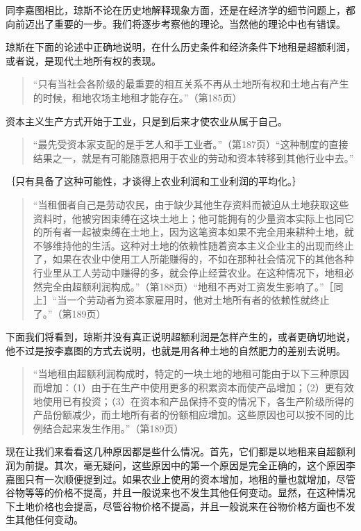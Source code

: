 同李嘉图相比，琼斯不论在历史地解释现象方面，还是在经济学的细节问题上，都向前迈出了重要的一步。我们将逐步考察他的理论。当然他的理论中也有错误。

琼斯在下面的论述中正确地说明，在什么历史条件和经济条件下地租是超额利润，或者说，是现代土地所有权的表现。

\begin{quote}{“只有当社会各阶级的最重要的相互关系不再从土地所有权和土地占有产生的时候，租地农场主地租才能存在。”（第185页）}\end{quote}

资本主义生产方式开始于工业，只是到后来才使农业从属于自己。

\begin{quote}{“最先受资本家支配的是手艺人和手工业者。”（第187页）“这种制度的直接结果之一，就是有可能随意把用于农业的劳动和资本转移到其他行业中去。”}\end{quote}

｛只有具备了这种可能性，才谈得上农业利润和工业利润的平均化。｝

\begin{quote}{“当租佃者自己是劳动农民，由于缺少其他生存资料而被迫从土地获取这些资料时，他被穷困束缚在这块土地上；他可能拥有的少量资本实际上也同它的所有者一起被束缚在土地上，因为这笔资本如果不完全用来耕种土地，就不够维持他的生活。这种对土地的依赖性随着资本主义企业主的出现而终止了，如果在农业中使用工人所能赚得的，不如在那种社会情况下的其他各种行业里从工人劳动中赚得的多，就会停止经营农业。在这种情况下，地租必然完全由超额利润构成。”（第188页）“地租不再对工资发生影响了。”［同上］“当一个劳动者为资本家雇用时，他对土地所有者的依赖性就终止了。”（第189页）}\end{quote}

下面我们将看到，琼斯并没有真正说明超额利润是怎样产生的，或者更确切地说，他不过是按李嘉图的方式去说明，也就是用各种土地的自然肥力的差别去说明。

\begin{quote}{“当地租由超额利润构成时，特定的一块土地的地租可能由于以下三种原因而增加：（1）由于在生产中使用更多的积累资本而使产品增加；（2）更有效地使用已有投资；（3）在资本和产品保持不变的情况下，各生产阶级所得的产品份额减少，而土地所有者的份额相应增加。这些原因也可以按不同的比例结合起来发生作用。”（第189页）}\end{quote}

现在让我们来看看这几种原因都是些什么情况。首先，它们都是以地租来自超额利润为前提。其次，毫无疑问，这些原因中的第一个原因是完全正确的，这个原因李嘉图只有一次顺便提到过。如果农业上使用的资本增加，地租的量也就增加，尽管谷物等等的价格不提高，并且一般说来也不发生其他任何变动。显然，在这种情况下土地价格也会提高，尽管谷物价格不提高，并且一般说来在谷物价格方面也不发生其他任何变动。

